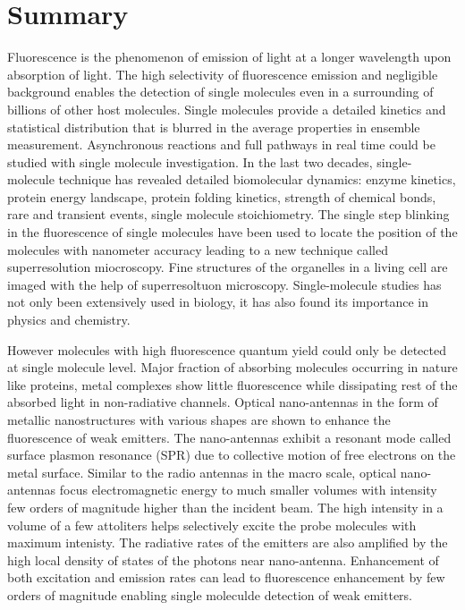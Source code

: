 \chapter*{Summary}
\label{ch:Summary}

Fluorescence is the phenomenon of emission of light at a longer wavelength upon absorption of light.
The high selectivity of fluorescence emission and negligible background enables the detection of single molecules even in a surrounding of billions of other host molecules.
Single molecules provide a detailed kinetics and statistical distribution that is blurred in the  average properties in ensemble measurement.
Asynchronous reactions and full pathways in real time could be studied with single molecule investigation.
In the last two decades, single-molecule technique has revealed detailed biomolecular dynamics: enzyme kinetics, protein energy landscape, protein folding kinetics, strength of chemical bonds, rare and transient events, single molecule stoichiometry.
The single step blinking in the fluorescence of single molecules have been used to locate the position of the molecules with nanometer accuracy leading to a new technique called superresolution miocroscopy.
Fine structures of the organelles in a living cell are imaged with the help of superresoltuon microscopy.
Single-molecule studies has not only been extensively used in biology, it has also found its importance in physics and chemistry.


However molecules with high fluorescence quantum yield could only be detected at single molecule level.
Major fraction of absorbing molecules occurring in nature like proteins, metal complexes show little fluorescence while dissipating rest of the absorbed light in non-radiative channels.
Optical nano-antennas in the form of metallic nanostructures with various shapes are shown to enhance the fluorescence of weak emitters.
The nano-antennas exhibit a resonant mode called surface plasmon resonance (SPR) due to collective motion of free electrons on the metal surface.
Similar to the radio antennas in the macro scale, optical nano-antennas focus electromagnetic energy to much smaller volumes with intensity few orders of magnitude higher than the incident beam.
The high intensity in a volume of a few attoliters helps selectively excite the probe molecules with maximum intenisty.
The radiative rates of the emitters are also amplified by the high local density of states of the photons near nano-antenna.
Enhancement of both excitation and emission rates can lead to fluorescence enhancement by few orders of magnitude enabling single moleculde detection of weak emitters.


